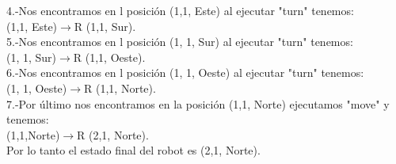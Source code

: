\documentclass{article}
\begin{document}
\begin{itemize}
            4.-Nos encontramos en l posición (1,1, Este) al ejecutar "turn" tenemos:\\
            (1,1, Este)$\rightarrow$R (1,1, Sur).\\

            5.-Nos encontramos en l posición (1, 1, Sur) al ejecutar "turn" tenemos:\\
            (1, 1, Sur)$\rightarrow$R (1,1, Oeste).\\

            6.-Nos encontramos en l posición (1, 1, Oeste) al ejecutar "turn" tenemos:\\
            (1, 1, Oeste)$\rightarrow$R (1,1, Norte).\\

            7.-Por último nos encontramos en la posición (1,1, Norte) ejecutamos "move" y tenemos:\\
            (1,1,Norte)$\rightarrow$R (2,1, Norte).\\

            Por lo tanto el estado final del robot es (2,1, Norte).\\
    \end{itemize}
\end{document}
